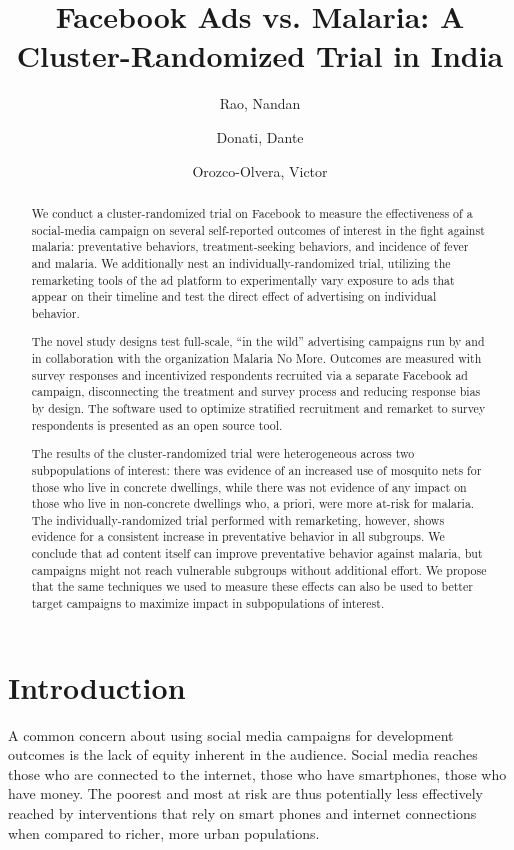 \documentclass[a4paper,12pt]{article}
\author{
  Rao, Nandan\\
  \and
  Donati, Dante\\
  \and
  Orozco-Olvera, Victor
}
\title{Facebook Ads vs. Malaria: A Cluster-Randomized Trial in India}
\begin{document}
\maketitle

\begin{abstract}
We conduct a cluster-randomized trial on Facebook to measure the effectiveness of a social-media campaign on several self-reported outcomes of interest in the fight against malaria: preventative behaviors, treatment-seeking behaviors, and incidence of fever and malaria. We additionally nest an individually-randomized trial, utilizing the remarketing tools of the ad platform to experimentally vary exposure to ads that appear on their timeline and test the direct effect of advertising on individual behavior.

The novel study designs test full-scale, ``in the wild'' advertising campaigns run by and in collaboration with the organization Malaria No More. Outcomes are measured with survey responses and incentivized respondents recruited via a separate Facebook ad campaign, disconnecting the treatment and survey process and reducing response bias by design. The software used to optimize stratified recruitment and remarket to survey respondents is presented as an open source tool.

The results of the cluster-randomized trial were heterogeneous across two subpopulations of interest: there was evidence of an increased use of mosquito nets for those who live in concrete dwellings, while there was not evidence of any impact on those who live in non-concrete dwellings who, a priori, were more at-risk for malaria. The individually-randomized trial performed with remarketing, however, shows evidence for a consistent increase in preventative behavior in all subgroups. We conclude that ad content itself can improve preventative behavior against malaria, but campaigns might not reach vulnerable subgroups without additional effort. We propose that the same techniques we used to measure these effects can also be used to better target campaigns to maximize impact in subpopulations of interest.


\end{abstract}

\clearpage

\section{Introduction}

A common concern about using social media campaigns for development outcomes is the lack of equity inherent in the audience. Social media reaches those who are connected to the internet, those who have smartphones, those who have money. The poorest and most at risk are thus potentially less effectively reached by interventions that rely on smart phones and internet connections when compared to richer, more urban populations.
\end{document}
